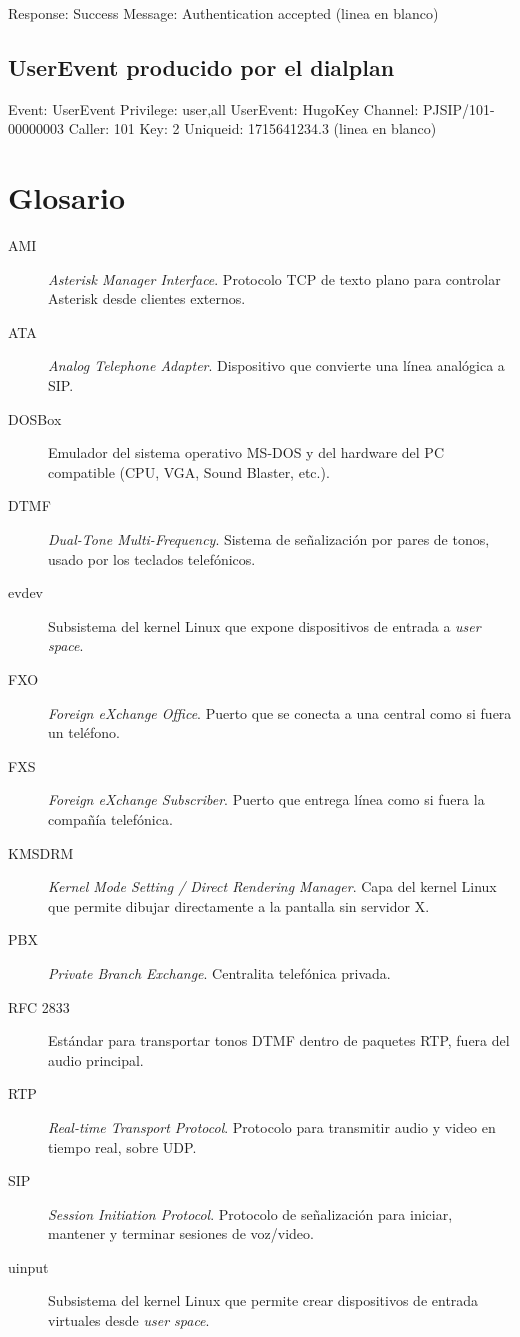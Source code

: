 \begin{plaincode}
Response: Success
Message: Authentication accepted
(linea en blanco)
\end{plaincode}

\subsection{UserEvent producido por el dialplan}

\begin{plaincode}
Event: UserEvent
Privilege: user,all
UserEvent: HugoKey
Channel: PJSIP/101-00000003
Caller: 101
Key: 2
Uniqueid: 1715641234.3
(linea en blanco)
\end{plaincode}

\section{Glosario}

\begin{description}
  \item[AMI] \emph{Asterisk Manager Interface}. Protocolo TCP de texto plano para controlar Asterisk desde clientes externos.
  \item[ATA] \emph{Analog Telephone Adapter}. Dispositivo que convierte una línea analógica a SIP.
  \item[DOSBox] Emulador del sistema operativo MS-DOS y del hardware del PC compatible (CPU, VGA, Sound Blaster, etc.).
  \item[DTMF] \emph{Dual-Tone Multi-Frequency}. Sistema de señalización por pares de tonos, usado por los teclados telefónicos.
  \item[evdev] Subsistema del kernel Linux que expone dispositivos de entrada a \emph{user space}.
  \item[FXO] \emph{Foreign eXchange Office}. Puerto que se conecta a una central como si fuera un teléfono.
  \item[FXS] \emph{Foreign eXchange Subscriber}. Puerto que entrega línea como si fuera la compañía telefónica.
  \item[KMSDRM] \emph{Kernel Mode Setting / Direct Rendering Manager}. Capa del kernel Linux que permite dibujar directamente a la pantalla sin servidor X.
  \item[PBX] \emph{Private Branch Exchange}. Centralita telefónica privada.
  \item[RFC 2833] Estándar para transportar tonos DTMF dentro de paquetes RTP, fuera del audio principal.
  \item[RTP] \emph{Real-time Transport Protocol}. Protocolo para transmitir audio y video en tiempo real, sobre UDP.
  \item[SIP] \emph{Session Initiation Protocol}. Protocolo de señalización para iniciar, mantener y terminar sesiones de voz/video.
  \item[uinput] Subsistema del kernel Linux que permite crear dispositivos de entrada virtuales desde \emph{user space}.
\end{description}

